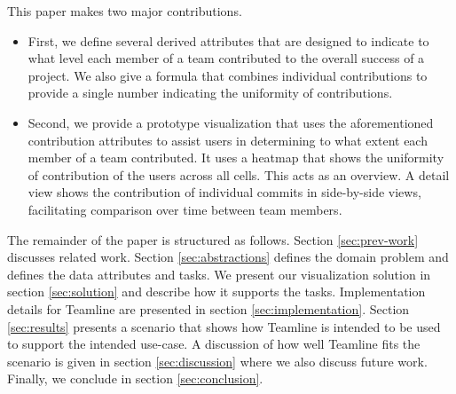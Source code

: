 \documentclass[../manifest.tex]{subfiles}
\begin{document}
This paper makes two major contributions.
\begin{itemize}
  \item First, we define several derived attributes that are designed to indicate to what level each member of a team contributed to the overall success of a project. We also give a formula that combines individual contributions to provide a single number indicating the uniformity of contributions.
  \item Second, we provide a prototype visualization that uses the aforementioned contribution attributes to assist users in determining to what extent each member of a team contributed. It uses a heatmap that shows the uniformity of contribution of the users across all cells. This acts as an overview. A detail view shows the contribution of individual commits in side-by-side views, facilitating comparison over time between team members.
\end{itemize}

The remainder of the paper is structured as follows. Section \ref{sec:prev-work} discusses related work. Section \ref{sec:abstractions} defines the domain problem and defines the data attributes and tasks. We present our visualization solution in section \ref{sec:solution} and describe how it supports the tasks. Implementation details for Teamline are presented in section \ref{sec:implementation}. Section \ref{sec:results} presents a scenario that shows how Teamline is intended to be used to support the intended use-case. A discussion of how well Teamline fits the scenario is given in section \ref{sec:discussion} where we also discuss future work. Finally, we conclude in section \ref{sec:conclusion}.
\end{document}
